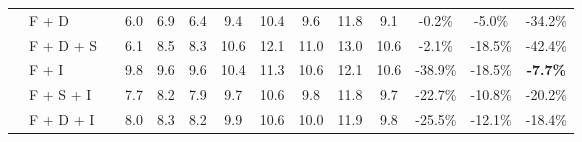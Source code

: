 \begin{table*}[t]
\begin{tabular}{@{}lllcccccccc|ccc@{}}
                                                                                        & F + D                  &                                                                           & 6.0                                 & 6.9             & 6.4               & 9.4            & 10.4          & 9.6                & 11.8           & 9.1                                          & -0.2\%                                        & -5.0\%                                     & -34.2\%                                    \\
                                                                                        & F + D + S              &                                                                           & 6.1                                 & 8.5             & 8.3               & 10.6           & 12.1          & 11.0               & 13.0           & 10.6                                         & -2.1\%                                        & -18.5\%                                    & -42.4\%                                    \\
                                                                                        & F + I                  &                                                                           & 9.8                                 & 9.6             & 9.6               & 10.4           & 11.3          & 10.6               & 12.1           & 10.6                                         & -38.9\%                                       & -18.5\%                                    & \textbf{-7.7\%}                            \\
                                                                                        & F + S + I              &                                                                           & 7.7                                 & 8.2             & 7.9               & 9.7            & 10.6          & 9.8                & 11.8           & 9.7                                          & -22.7\%                                       & -10.8\%                                    & -20.2\%                                    \\
                                                                                        & F + D + I              &                                                                           & 8.0                                 & 8.3             & 8.2               & 9.9            & 10.6          & 10.0               & 11.9           & 9.8                                          & -25.5\%                                       & -12.1\%                                    & -18.4\%                                    \\

\end{tabular}
\end{table*}
